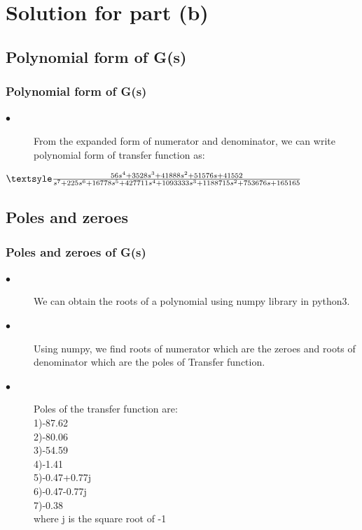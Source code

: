 \documentclass{beamer}
\theoremstyle{remark}
\begin{document}
\section{Solution for part (b)}

\subsection{Polynomial form of G(s)}
\begin{frame}
\frametitle{Polynomial form of G(s)}
\begin{enumerate}[label=(\roman*)]
\begin{description}
    \item[$\bullet$]From the expanded form of numerator and denominator, we can write polynomial form of transfer function as:
\end{description}

\vspace{0.2 in}
\noindent 
 $ {\textsyle \frac{56s^4+3528s^3+41888s^2+51576s+41552}{s^7+225s^6+16778s^5+427711s^4+1093333s^3+1188715s^2+753676s+165165}} $\\
\noindent
\vspace{0.1 in}

\end{enumerate}
\end{frame}











\subsection{Poles and zeroes}
\begin{frame}
\frametitle{Poles and zeroes of G(s)}
\begin{description}
\item[$\bullet$]We can obtain the roots of a polynomial using numpy library in python3.
\item[$\bullet$]Using numpy, we find roots of numerator which are the zeroes and roots of denominator which are the poles of Transfer function.
\item[$\bullet$]Poles of the transfer function are:\\
1)-87.62\\
2)-80.06\\
3)-54.59\\
4)-1.41\\
5)-0.47+0.77j\\
6)-0.47-0.77j\\
7)-0.38\\
\vspace{0.1 in}
where j is the square root of -1
\end{description}
\end{frame}
\end{document}
